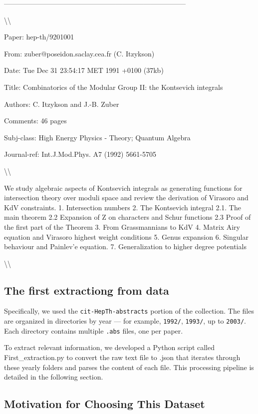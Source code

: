 \documentclass[12pt]{article}
\begin{document}
\begin{tcolorbox}
------------------------------------------------------------------------------

\textbackslash\textbackslash{}

Paper: hep-th/9201001

From: zuber@poseidon.saclay.cea.fr (C. Itzykson)

Date: Tue Dec 31 23:54:17 MET 1991 +0100   (37kb)

Title: Combinatorics of the Modular Group II: the Kontsevich integrals

Authors: C. Itzykson and J.-B. Zuber

Comments: 46 pages

Subj-class: High Energy Physics - Theory; Quantum Algebra

Journal-ref: Int.J.Mod.Phys. A7 (1992) 5661-5705

\textbackslash\textbackslash{}

We study algebraic aspects of Kontsevich integrals as generating functions for intersection theory over moduli space and review the derivation of Virasoro and KdV constraints.
1. Intersection numbers
2. The Kontsevich integral
2.1. The main theorem
2.2 Expansion of Z on characters and Schur functions
2.3 Proof of the first part of the Theorem
3. From Grassmannians to KdV
4. Matrix Airy equation and Virasoro highest weight conditions
5. Genus expansion
6. Singular behaviour and Painlev'e equation.
7. Generalization to higher degree potentials
 
\textbackslash\textbackslash{}
\end{tcolorbox}


\subsection{The first extractiong from data}

Specifically, we used the \texttt{cit-HepTh-abstracts} portion of the collection. The files are organized in directories by year --- for example, \texttt{1992/}, \texttt{1993/}, up to \texttt{2003/}. Each directory contains multiple \texttt{.abs} files, one per paper.

To extract relevant information, we developed a Python script called First\_extraction.py to convert the raw text file to .json that iterates through these yearly folders and parses the content of each file. This processing pipeline is detailed in the following section.

\subsection{Motivation for Choosing This Dataset}
\end{document}
